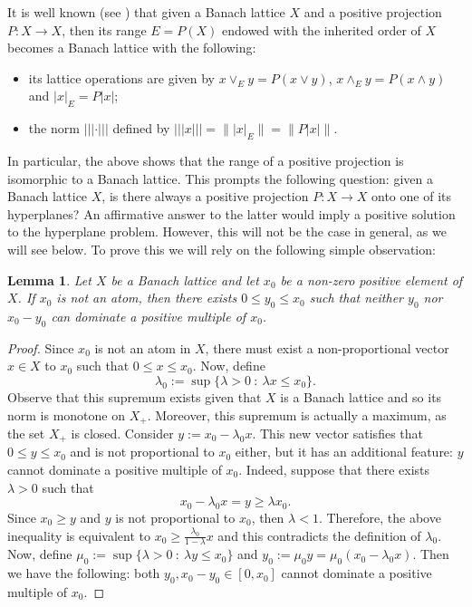 \documentclass[11pt]{amsart}
\newtheorem{lem}[thm]{Lemma}
\theoremstyle{definition}
\numberwithin{equation}{section}
\begin{document}
It is well known (see \cite[Theorem 5.59]{AA-book}) that given a Banach lattice $X$ and a positive projection $P:X\to X$, then its range $E=P(X)$ endowed with the inherited order of $X$ becomes a Banach lattice with the following:
\begin{itemize}
    \item its lattice operations are given by $x\lor_E y=P(x\lor y)$, $x\land_E y=P(x\land y)$ and $|x|_E=P|x|$;
    \item the norm $|||\cdot|||$ defined by $|||x|||=\||x|_E\|=\|P|x|\|$.
\end{itemize}


In particular, the above shows that the range of a positive projection is isomorphic to a Banach lattice. This prompts the following question: given a Banach lattice $X$, is there always a positive projection $P:X\to X$ onto one of its hyperplanes? An affirmative answer to the latter would imply a positive solution to the hyperplane problem. However, this will not be the case in general, as we will see below. To prove this we will rely on the following simple observation:
\begin{lem}
Let $X$ be a Banach lattice and let $x_0$ be a non-zero positive element of $X$. If $x_0$ is not an atom, then there exists $0\leq y_0\leq x_0$ such that neither $y_0$ nor $x_0-y_0$ can dominate a positive multiple of $x_0$. 
\end{lem}
\begin{proof}%
Since $x_0$ is not an atom in $X$, there must exist a non-proportional vector $x\in X$ to $x_0$ such that $0\leq x\leq x_0$. Now, define
$$
\lambda_0:=\sup\{\lambda>0\::\: \lambda x\leq x_0\}.
$$
Observe that this supremum exists given that $X$ is a Banach lattice and so its norm is monotone on $X_+$. Moreover, this supremum is actually a maximum, as the set $X_+$ is closed. Consider $y:=x_0-\lambda_0 x$. This new vector satisfies that $0\leq y\leq x_0$ and
is not proportional to $x_0$ either, but it has an additional feature: $y$ cannot dominate a positive multiple of $x_0$. Indeed, suppose that there exists $\lambda>0$ such that 
$$
x_0-\lambda_0x=y\geq \lambda x_0.
$$
Since $x_0\geq y$ and $y$ is not proportional to $x_0$, then $\lambda< 1$. Therefore, the above inequality is equivalent to $x_0\geq \frac{\lambda_0}{1-\lambda}x$ and this contradicts the definition of $\lambda_0$. Now, define $\mu_0:=\sup\{\lambda>0\::\: \lambda y\leq x_0\}$ and $y_0:=\mu_0 y=\mu_0(x_0-\lambda_0x)$. Then we have the following: both $y_0,x_0-y_0\in [0,x_0]$ cannot dominate a positive multiple of $x_0$. 
\end{proof}
\end{document}
